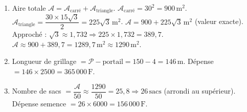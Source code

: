 \documentclass[11pt]{article}
\begin{document}
\begin{corrige}
\begin{enumerate}
\item Aire totale $\mathcal{A} = \mathcal{A}_{\text{carré}} + \mathcal{A}_{\text{triangle}}$.
$\mathcal{A}_{\text{carré}} = 30^2 = 900\,\text{m}^2$.
$\mathcal{A}_{\text{triangle}} = \dfrac{30 \times 15\sqrt{3}}{2} = 225\sqrt{3}\,\text{m}^2$.
$\mathcal{A} = 900 + 225\sqrt{3}\,\text{m}^2$ (valeur exacte).
Approché : $\sqrt{3}\approx 1,732 \Rightarrow 225\times 1,732 = 389,7$.
$\mathcal{A} \approx 900 + 389,7 = 1289,7\,\text{m}^2 \approx \boxed{1290\,\text{m}^2}$.
\item Longueur de grillage $= \mathcal{P} - \text{portail} = 150 - 4 = 146\,\text{m}$.
Dépense $= 146 \times 2500 = 365\,000\,\text{F}$.
\item Nombre de sacs $= \dfrac{\mathcal{A}}{50} \approx \dfrac{1290}{50} = 25,8 \Rightarrow \boxed{26\,\text{sacs}}$ (arrondi au supérieur).
Dépense semence $= 26 \times 6000 = 156\,000\,\text{F}$.
\end{enumerate}
\end{corrige}
\end{document}
